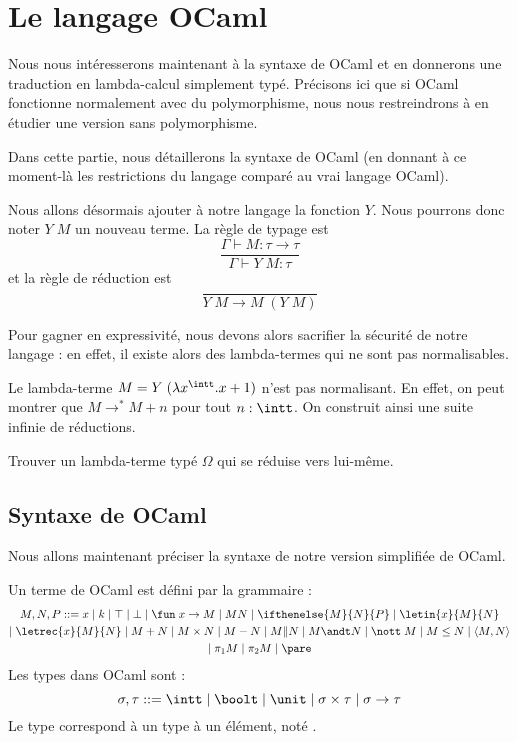 \section[OCaml]{Le langage OCaml}

Nous nous intéresserons maintenant à la syntaxe de OCaml et en donnerons une traduction en lambda-calcul simplement typé. Précisons ici que si OCaml fonctionne normalement avec du polymorphisme, nous nous restreindrons à en étudier une version sans polymorphisme.

Dans cette partie, nous détaillerons la syntaxe de OCaml (en donnant à ce moment-là les restrictions du langage comparé au vrai langage OCaml).

Nous allons désormais ajouter à notre langage la \og fonction\fg{} $Y$. Nous pourrons donc noter $Y\;M$ un nouveau terme. La règle de typage est $$\dfrac{\Gamma\vdash M : \tau \to\tau}{\Gamma\vdash Y\; M : \tau}$$ et la règle de réduction est $$\dfrac{}{Y\;M\to M\;(Y\;M)}$$

Pour gagner en expressivité, nous devons alors sacrifier la sécurité de notre langage : en effet, il existe alors des lambda-termes qui ne sont pas normalisables.

\begin{expl}
    Le lambda-terme $M=Y\;(\lambda x^{\intt}.x+1)$ n'est pas normalisant. En effet, on peut montrer que $M\to^* M + n$ pour tout $n : \intt$. On construit ainsi une suite infinie de réductions.
\end{expl}

\begin{exo}
    Trouver un lambda-terme typé $\Omega$ qui se réduise vers lui-même.
\end{exo}

\subsection{Syntaxe de OCaml}

Nous allons maintenant préciser la syntaxe de notre version simplifiée de OCaml.

\begin{defi}
    Un terme de OCaml est défini par la grammaire :
    \begin{multline*}
        M,N,P ::= x\mid k\mid \top\mid\bot\mid \fun \;x\to M\mid M N\mid \ifthenelse{M}{N}{P}\mid \letin{x}{M}{N} \\\mid \letrec{x}{M}{N}\mid M+N\mid M\times N\mid M-N \mid M\| N \mid M \andt N\mid \nott\; M\mid M\leq N\mid \langle M,N\rangle\\\mid \pi_1M\mid \pi_2 M\mid \pare
    \end{multline*}
    Les types dans OCaml sont :
        $$\sigma,\tau ::= \intt\mid\boolt\mid\unit\mid \sigma\times \tau\mid\sigma\to\tau$$
    Le type \unit{} correspond à un type à un élément, noté \pare.
\end{defi}

